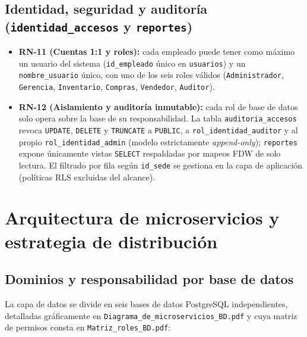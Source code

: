 \documentclass[11pt,oneside]{article}
\begin{document}
\subsection{Identidad, seguridad y auditor\'ia (\texttt{identidad\_accesos} y \texttt{reportes})}
\begin{itemize}[leftmargin=1.5em, itemsep=2.5pt]
  \item \textbf{RN-11 (Cuentas 1:1 y roles):} cada empleado puede tener como
        m\'aximo un usuario del sistema (\texttt{id\_\allowbreak empleado} \'unico
        en \texttt{usuarios}) y un \texttt{nombre\_\allowbreak usuario} \'unico,
        con uno de los seis roles v\'alidos (\texttt{Administrador},
        \texttt{Gerencia}, \texttt{Inventario}, \texttt{Compras},
        \texttt{Vendedor}, \texttt{Auditor}).
  \item \textbf{RN-12 (Aislamiento y auditor\'ia inmutable):} cada rol de
        base de datos solo opera sobre la base de su responsabilidad. La tabla
        \texttt{auditoria\_accesos} revoca \texttt{UPDATE}, \texttt{DELETE} y
        \texttt{TRUNCATE} a \texttt{PUBLIC}, a \texttt{rol\_identidad\_auditor}
        y al propio \texttt{rol\_identidad\_admin} (modelo estrictamente
        \textit{append-only}); \texttt{reportes} expone \'unicamente vistas
        \texttt{SELECT} respaldadas por mapeos FDW de solo lectura. El filtrado
        por fila seg\'un \texttt{id\_sede} se gestiona en la capa de aplicaci\'on
        (pol\'iticas RLS excluidas del alcance).
\end{itemize}

\section{Arquitectura de microservicios y estrategia de distribuci\'on}

\subsection{Dominios y responsabilidad por base de datos}

La capa de datos se divide en seis bases de datos PostgreSQL independientes,
detalladas gr\'aficamente en \texttt{Diagrama\_de\_\allowbreak microservicios\_BD.pdf}
y cuya matriz de permisos consta en \texttt{Matriz\_roles\_BD.pdf}:
\end{document}
